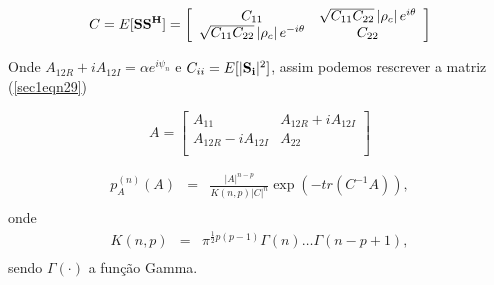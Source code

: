 \documentclass[12pt,a4paper]{article}
\begin{document}
\begin{equation}\label{sec1eqn30}
	C=E[{\bf SS^{H}}]=\left[
\begin{array}{cc}
	C_{11}              & \sqrt{C_{11}C_{22}}\left|\rho_c \right|e^{i\theta} \\
 \sqrt{C_{11}C_{22}}\left|\rho_c \right|e^{-i\theta} & C_{22}\\
\end{array}\right]
\end{equation}

Onde $A_{12R}+iA_{12I}=\alpha e^{i\psi_n}$ e $C_{ii}=E[|{\bf S_i}|^2]$, assim podemos rescrever a matriz (\ref{sec1eqn29})

\begin{equation}\label{sec1eqn31}
	A=\left[
\begin{array}{cc}
	A_{11}              & A_{12R}+iA_{12I} \\
	A_{12R}-iA_{12I}    & A_{22} \\
\end{array}\right]
\end{equation}


\begin{equation}\label{sec1eqn32}
\begin{array}{ccc}
	p_A^{(n)}(A)&=&\frac{|A|^{n-p}}{K(n,p)|C|^n} \exp(-tr(C^{-1}A)), \\
\end{array}
\end{equation}
onde
\begin{equation}\label{sec1eqn33}
\begin{array}{ccc}
	K(n,p)&=&\pi^{\frac{1}{2}p(p-1)}\Gamma(n)\dots\Gamma(n-p+1), \\
\end{array}
\end{equation}
sendo $\Gamma(\cdot)$ a função Gamma.
\end{document}
